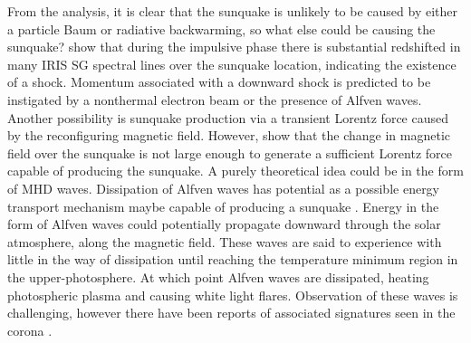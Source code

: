 From the analysis, it is clear that the sunquake is unlikely to be caused by either a particle Baum or radiative backwarming, so what else could be causing the sunquake? \cite{2015ApJ...812...35M} show that during the impulsive phase there is substantial redshifted in many IRIS SG spectral lines over the sunquake location, indicating the existence of a shock. Momentum associated with a downward shock is predicted to be instigated by a nonthermal electron beam or the presence of Alfven waves. Another possibility is sunquake production via a transient Lorentz force caused by the reconfiguring magnetic field. However, \cite{2014ApJ...796...85J} show that the change in magnetic field over the sunquake is not large enough to generate a sufficient Lorentz force capable of producing the sunquake. A purely theoretical idea could be in the form of MHD waves. Dissipation of Alfven waves \citep{1982SoPh...80...99E} has potential as a possible energy transport mechanism maybe capable of producing a sunquake \citep{2015ApJ...812...35M}. Energy in the form of Alfven waves could potentially propagate downward through the solar atmosphere, along the magnetic field. These waves are said to experience with little in the way of dissipation until reaching the temperature minimum region in the upper-photosphere. At which point Alfven waves are dissipated, heating photospheric plasma and causing white light flares. Observation of these waves is challenging, however there have been reports of associated signatures seen in the corona \citep{2009A&A...501L..15B}. 

